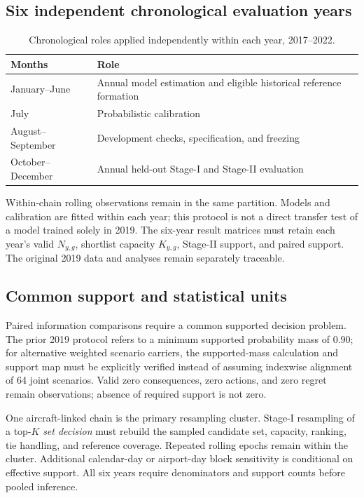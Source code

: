 \documentclass[10pt,a4paper]{article}
\numberwithin{equation}{section}
\begin{document}
\subsection{Six independent chronological evaluation years}
\begin{table}[htbp]\centering\small
\caption{Chronological roles applied independently within each year, 2017--2022.}\label{tab:sup_temporal}
\begin{tabular}{ll}\toprule
Months & Role\\\midrule
January--June & Annual model estimation and eligible historical reference formation\\
July & Probabilistic calibration\\
August--September & Development checks, specification, and freezing\\
October--December & Annual held-out Stage-I and Stage-II evaluation\\
\bottomrule\end{tabular}\end{table}
Within-chain rolling observations remain in the same partition. Models and calibration are fitted within each year; this protocol is not a direct transfer test of a model trained solely in 2019. The six-year result matrices must retain each year's valid $N_{y,g}$, shortlist capacity $K_{y,g}$, Stage-II support, and paired support. The original 2019 data and analyses remain separately traceable.

\subsection{Common support and statistical units}
Paired information comparisons require a common supported decision problem. The prior 2019 protocol refers to a minimum supported probability mass of 0.90; for alternative weighted scenario carriers, the supported-mass calculation and support map must be explicitly verified instead of assuming indexwise alignment of 64 joint scenarios. Valid zero consequences, zero actions, and zero regret remain observations; absence of required support is not zero.

One aircraft-linked chain is the primary resampling cluster. Stage-I resampling of a top-$K$ \emph{set decision} must rebuild the sampled candidate set, capacity, ranking, tie handling, and reference coverage. Repeated rolling epochs remain within the cluster. Additional calendar-day or airport-day block sensitivity is conditional on effective support. All six years require denominators and support counts before pooled inference.
\end{document}
